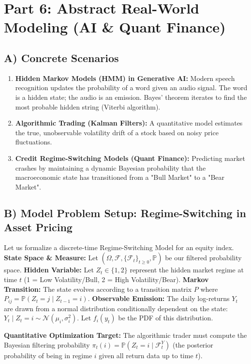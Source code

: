 \documentclass[12pt]{article}
\begin{document}
\section{Part 6: Abstract Real-World Modeling (AI \& Quant Finance)}

\subsection{A) Concrete Scenarios}
\begin{enumerate}
    \item \textbf{Hidden Markov Models (HMM) in Generative AI:} Modern speech recognition updates the probability of a word given an audio signal. The word is a hidden state; the audio is an emission. Bayes' theorem iterates to find the most probable hidden string (Viterbi algorithm).
    \item \textbf{Algorithmic Trading (Kalman Filters):} A quantitative model estimates the true, unobservable volatility drift of a stock based on noisy price fluctuations.
    \item \textbf{Credit Regime-Switching Models (Quant Finance):} Predicting market crashes by maintaining a dynamic Bayesian probability that the macroeconomic state has transitioned from a "Bull Market" to a "Bear Market".
\end{enumerate}

\subsection{B) Model Problem Setup: Regime-Switching in Asset Pricing}
Let us formalize a discrete-time Regime-Switching Model for an equity index.
\textbf{State Space \& Measure:} Let $(\Omega, \mathcal{F}, \{\mathcal{F}_t\}_{t \ge 0}, \mathbb{P})$ be our filtered probability space.
\textbf{Hidden Variable:} Let $Z_t \in \{1, 2\}$ represent the hidden market regime at time $t$ (1 = Low Volatility/Bull, 2 = High Volatility/Bear).
\textbf{Markov Transition:} The state evolves according to a transition matrix $P$ where $P_{ij} = \mathbb{P}(Z_{t} = j \mid Z_{t-1} = i)$.
\textbf{Observable Emission:} The daily log-returns $Y_t$ are drawn from a normal distribution conditionally dependent on the state: $Y_t \mid Z_t=i \sim \mathcal{N}(\mu_i, \sigma_i^2)$. Let $f_i(y_t)$ be the PDF of this distribution.

\textbf{Quantitative Optimization Target:} The algorithmic trader must compute the Bayesian filtering probability $\pi_t(i) = \mathbb{P}(Z_t = i \mid \mathcal{F}^Y_t)$ (the posterior probability of being in regime $i$ given all return data up to time $t$).
\end{document}

